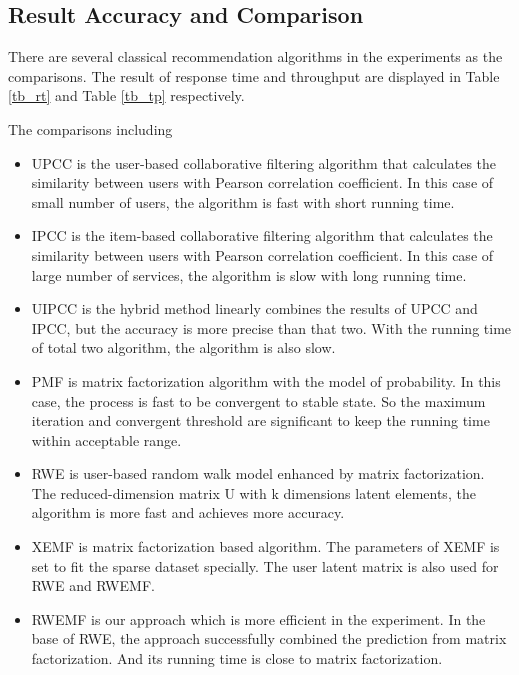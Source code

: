 \documentclass[conference]{IEEEtran}
\begin{document}
\subsection{Result Accuracy and Comparison}
\par There are several classical recommendation algorithms in the experiments as the comparisons. The result of response time and throughput
 are displayed in Table \ref{tb_rt} and Table \ref{tb_tp} respectively.
\par The comparisons including
\begin{itemize}
\item UPCC is the user-based collaborative filtering algorithm that calculates the similarity between users with Pearson correlation coefficient. In this case of small number of users, the algorithm is fast with short running time. 
\item IPCC is the item-based collaborative filtering algorithm that calculates the similarity between users with Pearson correlation coefficient. In this case of large number of services, the algorithm is slow with long running time. 
\item UIPCC is the hybrid method linearly combines the results of UPCC and IPCC, but the accuracy is more precise than that two. With the running time of total two algorithm, the algorithm is also slow.
\item PMF is matrix factorization\cite{r_salakhutdinov__a_mnih_probability_2007} algorithm with the model of probability. In this case, the process is fast to be convergent to stable state. So the maximum iteration and convergent threshold are significant to keep the running time within acceptable range.
\item RWE is user-based random walk model enhanced by matrix factorization. The reduced-dimension matrix U with k dimensions latent elements, the algorithm is more fast and achieves more accuracy.
\item XEMF is matrix factorization based algorithm. The parameters of XEMF is set to fit the sparse dataset specially. The user latent matrix is also used for RWE and RWEMF.
\item RWEMF is our approach which is more efficient in the experiment. In the base of RWE, the approach successfully combined the prediction from matrix factorization. And its running time is close to matrix factorization.
\end{itemize}
\end{document}
